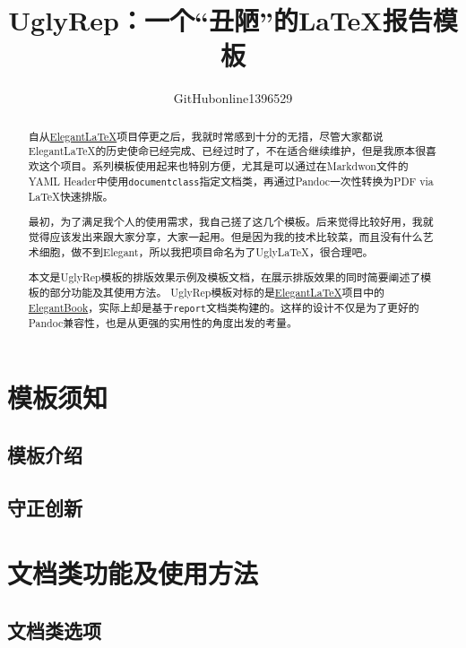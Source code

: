 \documentclass[12pt, textbook, green]{uglyrep}
\title{\bfseries UglyRep：一个“丑陋”的\LaTeX{}报告模板}
\author{GitHubonline1396529}
\date{\zhdate{2022/12/31}}
\begin{document}
\maketitle
\begin{abstract}
  自从\href{https://github.com/ElegantLaTeX/}{Elegant\LaTeX}项目停更之后，我就时常感到十分的无措，尽管大家都说 Elegant\LaTeX 的历史使命已经完成、已经过时了，不在适合继续维护，但是我原本很喜欢这个项目。系列模板使用起来也特别方便，尤其是可以通过在Markdwon文件的YAML Header中使用\texttt{documentclass}指定文档类，再通过Pandoc一次性转换为PDF via \LaTeX{}快速排版。

  最初，为了满足我个人的使用需求，我自己搓了这几个模板。后来觉得比较好用，我就觉得应该发出来跟大家分享，大家一起用。但是因为我的技术比较菜，而且没有什么艺术细胞，做不到Elegant，所以我把项目命名为了Ugly\LaTeX{}，很合理吧。

  本文是UglyRep模板的排版效果示例及模板文档，在展示排版效果的同时简要阐述了模板的部分功能及其使用方法。%
  UglyRep模板对标的是\href{https://github.com/ElegantLaTeX/}{Elegant\LaTeX}项目中的\href{https://github.com/ElegantLaTeX/ElegantBook}{ElegantBook}，实际上却是基于\texttt{report}文档类构建的。这样的设计不仅是为了更好的Pandoc兼容性，也是从更强的实用性的角度出发的考量。

\end{abstract}

\tableofcontents

\chapter{模板须知}
\section{模板介绍}


\section{守正创新}


\chapter{文档类功能及使用方法}
\section{文档类选项}\label{ssec:classoptions}
\end{document}
